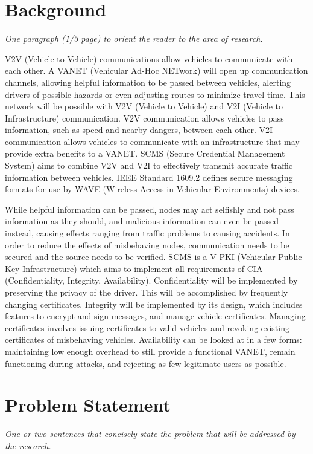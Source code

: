 \documentclass {article}
\newcommand{\sechint}[1]{\small{\emph{#1}} \bigskip}
\begin{document}
\tableofcontents
\pagebreak

\section{Background}{\sechint{One paragraph (1/3 page) to orient the reader to the area of research.}}

V2V (Vehicle to Vehicle) communications allow vehicles to communicate with each other. A VANET (Vehicular Ad-Hoc NETwork) will open up communication channels, allowing helpful information to be passed between vehicles, alerting drivers of possible hazards or even adjusting routes to minimize travel time. This network will be possible with V2V (Vehicle to Vehicle) and V2I (Vehicle to Infrastructure) communication. V2V communication allows vehicles to pass information, such as speed and nearby dangers, between each other. V2I communication allows vehicles to communicate with an infrastructure that may provide extra benefits to a VANET. SCMS (Secure Credential Management System) aims to combine V2V and V2I to effectively transmit accurate traffic information between vehicles. IEEE Standard 1609.2 defines secure messaging formats for use by WAVE (Wireless Access in Vehicular Environments) devices.

While helpful information can be passed, nodes may act selfishly and not pass information as they should, and malicious information can even be passed instead, causing effects ranging from traffic problems to causing accidents. In order to reduce the effects of misbehaving nodes, communication needs to be secured and the source needs to be verified. SCMS is a V-PKI (Vehicular Public Key Infrastructure) which aims to implement all requirements of CIA (Confidentiality, Integrity, Availability). Confidentiality will be implemented by preserving the privacy of the driver. This will be accomplished by frequently changing certificates. Integrity will be implemented by its design, which includes features to encrypt and sign messages, and manage vehicle certificates. Managing certificates involves issuing certificates to valid vehicles and revoking existing certificates of misbehaving vehicles. Availability can be looked at in a few forms: maintaining low enough overhead to still provide a functional VANET, remain functioning during attacks, and rejecting as few legitimate users as possible.

\section{Problem Statement}{\sechint{One or two sentences that concisely state the problem that will be addressed by the research.}}
\end{document}
